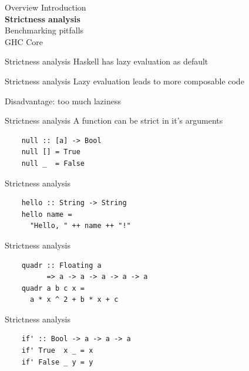 \documentclass[20pt]{beamer}
\newcommand{\vspaced}{
    \vspace{5mm}
}
\begin{document}

\begin{frame}{Overview}
    Introduction \\
    \textbf{Strictness analysis} \\
    Benchmarking pitfalls \\
    GHC Core \\
\end{frame}

\begin{frame}{Strictness analysis}
    Haskell has lazy evaluation as default
\end{frame}

\begin{frame}{Strictness analysis}
    Lazy evaluation leads to more composable code \\
    \vspaced
    Disadvantage: too much laziness
\end{frame}

\begin{frame}[fragile]{Strictness analysis}
    A function can be strict in it's arguments
    \vspaced
    \begin{lstlisting}
    null :: [a] -> Bool
    null [] = True
    null _  = False
    \end{lstlisting}
\end{frame}

\begin{frame}[fragile]{Strictness analysis}
    \begin{lstlisting}
    hello :: String -> String
    hello name =
      "Hello, " ++ name ++ "!"
    \end{lstlisting}
\end{frame}

\begin{frame}[fragile]{Strictness analysis}
    \begin{lstlisting}
    quadr :: Floating a
          => a -> a -> a -> a -> a
    quadr a b c x =
      a * x ^ 2 + b * x + c
    \end{lstlisting}
\end{frame}

\begin{frame}[fragile]{Strictness analysis}
    \begin{lstlisting}
    if' :: Bool -> a -> a -> a
    if' True  x _ = x
    if' False _ y = y
    \end{lstlisting}
\end{frame}
\end{document}
